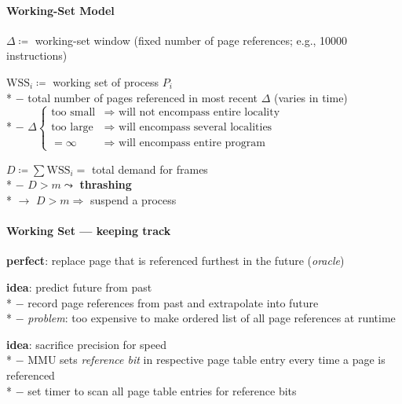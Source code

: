 \paragraph{Working-Set Model}
\begin{items}
  \item $ \Delta \coloneqq $ working-set window (fixed number of page references; e.g., 10000 instructions)
  \item $ \text{WSS}_i \coloneqq $ working set of process $ P_i $ \\*
    $ - $ total number of pages referenced in most recent $ \Delta $ (varies in time) \\*
    $ - $ $ \Delta \begin{cases}
      \text{too small} &\Rightarrow \text{ will not encompass entire locality} \\
      \text{too large} &\Rightarrow \text{ will encompass several localities} \\
      = \infty &\Rightarrow \text{ will encompass entire program}
    \end{cases} $
  \item $ D \coloneqq \sum \text{WSS}_i = $ total demand for frames \\*
    $ - $ $ D > m \leadsto $ \textbf{thrashing} \\*
    $ \to $ $ D > m \Rightarrow $ suspend a process
\end{items}

\paragraph{Working Set --- keeping track}
\begin{items}
  \item \textbf{perfect}: replace page that is referenced furthest in the future (\emph{oracle})
  \item \textbf{idea}: predict future from past \\*
    $ - $ record page references from past and extrapolate into future \\*
    $ - $ \emph{problem}: too expensive to make ordered list of all page references at runtime
  \item \textbf{idea}: sacrifice precision for speed \\*
    $ - $ MMU sets \emph{reference bit} in respective page table entry every time a page is referenced \\*
    $ - $ set timer to scan all page table entries for reference bits
\end{items}

